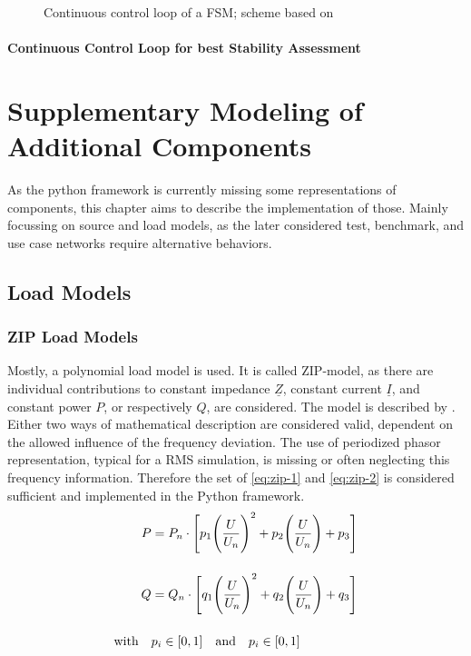 \begin{figure}[htb!]
        \centering
        \caption{Continuous control loop of a \acs{FSM}; scheme based on \textcite{burlakinEnhancedVoltageControl2024}}
        \label{fig:fsm-continuous-control-loop}
\end{figure}

\subsubsection{Continuous Control Loop for best Stability Assessment}

\chapter{Supplementary Modeling of Additional Components}

As the python framework is currently missing some representations of components, this chapter aims to describe the implementation of those. Mainly focussing on source and load models, as the later considered test, benchmark, and use case networks require alternative behaviors. 

\section{Load Models}

\subsection{ZIP Load Models}


Mostly, a polynomial load model is used. It is called ZIP-model, as there are individual contributions to constant impedance $\underline{Z}$, constant current $\underline{I}$, and constant power $P$, or respectively $Q$, are considered. The model is described by \textcite{IEEEGuideLoad2022}. Either two ways of mathematical description are considered valid, dependent on the allowed influence of the frequency deviation. The use of periodized phasor representation, typical for a \acs{RMS} simulation, is missing or often neglecting this frequency information. Therefore the set of \autoref{eq:zip-1} and \autoref{eq:zip-2} is considered sufficient and implemented in the Python framework.
\begin{align}
        P&=P_n \cdot \Bigg[ p_1 \Bigg(\frac{U}{U_n}\Bigg)^2 + p_2 \Bigg(\frac{U}{U_n}\Bigg) + p_3 \Bigg] \label{eq:zip-1} \\[12pt]
        Q&=Q_n \cdot \Bigg[ q_1 \Bigg(\frac{U}{U_n}\Bigg)^2 + q_2 \Bigg(\frac{U}{U_n}\Bigg) + q_3 \Bigg] \label{eq:zip-2} \\[12pt]
        \text{with} \quad &p_i \in [0,1] \quad \text{and} \quad p_i \in [0,1] \notag
\end{align}

